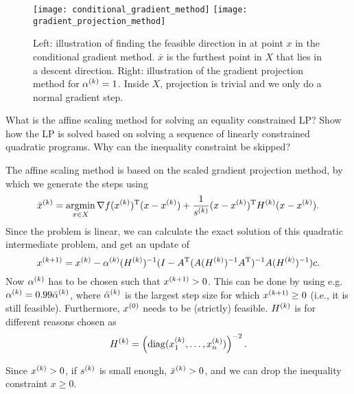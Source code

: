 \documentclass{article}
\begin{document}
\begin{figure}[H]
  \centering
  \texttt{[image: conditional\_gradient\_method]}
  \hspace{1em}
  \texttt{[image: gradient\_projection\_method]}
  \caption{Left: illustration of finding the feasible direction in at point \(x\) in the conditional
    gradient method. \(\bar{x}\) is the furthest point in \(X\) that lies in a descent direction.
    Right: illustration of the gradient projection method for \(\kth{\alpha} = 1\).  Inside \(X\),
    projection is trivial and we only do a normal gradient
    step.\label{fig:feasible-direction-methods}}
\end{figure}

\begin{question}
  What is the affine scaling method for solving an equality constrained LP? Show how the LP is
  solved based on solving a sequence of linearly constrained quadratic programs. Why can the
  inequality constraint be skipped?
\end{question}

The affine scaling method is based on the scaled gradient projection method, by which we generate
the steps using
\begin{equation*}
  \kth{\bar{x}} = \argmin_{x \in X} \T{\nabla f(\kth{x})} (x - \kth{x}) +
  \frac{1}{\kth{s}} \T{(x - \kth{x})} \kth{H} (x - \kth{x}).
\end{equation*}
Since the problem is linear, we can calculate the exact solution of this quadratic intermediate
problem, and get an update of
\begin{equation*}
  \kth[k+1]{x} = \kth{x} -
  \kth{\alpha}(\kth{H})^{-1}(I - \T{A} (A(\kth{H})^{-1}\T{A})^{-1} A (\kth{H})^{-1})c.
\end{equation*}
Now \(\kth{\alpha}\) has to be chosen such that \(\kth[k+1]{x} > 0\).  This can be done by using
e.g. \(\kth{\alpha} = 0.99\kth{\bar{\alpha}}\), where \(\kth{\bar{\alpha}}\) is the largest step
size for which \(\kth[k+1]{x} \geq 0\) (i.e., it is still feasible).  Furthermore, \(\kth[0]{x}\)
needs to be (strictly) feasible. \(\kth{H}\) is for different reasons chosen as
\begin{equation*}
  \kth{H} = \left( \diag(\kth{x}_1, \dots, \kth{x}_n) \right)^{-2}.
\end{equation*}

Since \(\kth{x} > 0\), if \(\kth{s}\) is small enough, \(\kth{\bar{x}} > 0\), and we can drop the
inequality constraint \(x \geq 0\).
\end{document}
